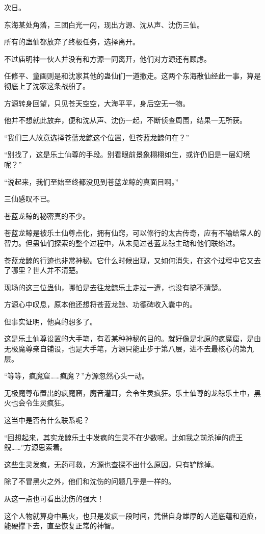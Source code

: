 \begin{this_body}
次日。

东海某处角落，三团白光一闪，现出方源、沈从声、沈伤三仙。

所有的蛊仙都放弃了终极任务，选择离开。

不过庙明神一伙人并没有和方源一同离开，他们对方源还有顾虑。

任修平、童画则是和沈家其他的蛊仙们一道撤走。这两个东海散仙经此一事，算是彻底上了沈家这条战船了。

方源转身回望，只见苍天空空，大海平平，身后空无一物。

他并不想就此放弃，便和沈从声、沈伤一起，不断侦查周围，结果一无所获。

“我们三人故意选择苍蓝龙鲸这个位置，但苍蓝龙鲸何在？”

“别找了，这是乐土仙尊的手段。别看眼前景象栩栩如生，或许仍旧是一层幻境呢？”

“说起来，我们至始至终都没见到苍蓝龙鲸的真面目啊。”

三仙感叹不已。

苍蓝龙鲸的秘密真的不少。

苍蓝龙鲸是被乐土仙尊点化，拥有仙窍，可以修行的太古传奇，应有不输给常人的智力。但蛊仙们探索的整个过程中，从未见过苍蓝龙鲸主动和他们联络过。

苍蓝龙鲸的行迹也非常神秘。它什么时候出现，又如何消失，在这个过程中它又去了哪里？世人并不清楚。

现场的这三位蛊仙，哪怕是去往龙鲸乐土走过一遭，也没有搞不清楚。

方源心中叹息，原本他还想将苍蓝龙鲸、功德碑收入囊中的。

但事实证明，他真的想多了。

这是乐土仙尊设置的大手笔，有着某种神秘的目的。就好像是北原的疯魔窟，是由无极魔尊亲自铺设，也是大手笔，方源只能止步于第八层，进不去最核心的第九层。

“等等，疯魔窟……疯魔？”方源忽然心头一动。

无极魔尊布置出的疯魔窟，魔音灌耳，会令生灵疯狂。乐土仙尊的龙鲸乐土中，黑火也会令生灵疯狂。

这当中是否有什么联系呢？

“回想起来，其实龙鲸乐土中发疯的生灵不在少数呢。比如我之前杀掉的虎王鲵……”方源思索着。

这些生灵发疯，无药可救，方源也查探不出什么原因，只有铲除掉。

除了不冒黑火之外，他们和沈伤的问题几乎是一样的。

从这一点也可看出沈伤的强大！

这个人物就算身中黑火，也只是发疯一段时间，凭借自身雄厚的人道底蕴和道痕，能硬撑下去，直至恢复正常的神智。


\end{this_body}
